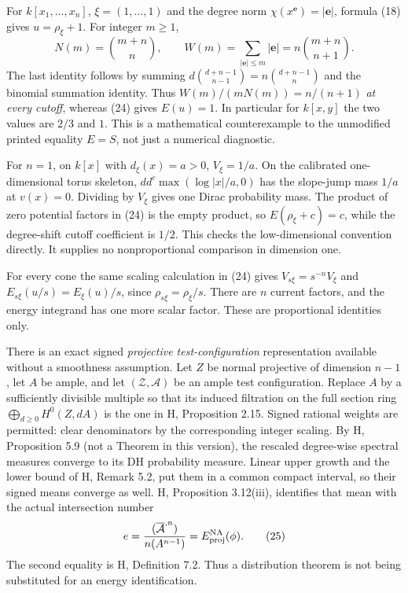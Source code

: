 \documentclass[
  11pt,
]{article}
\begin{document}
For \(k[x_1,\ldots,x_n]\), \(\xi=(1,\ldots,1)\) and the degree norm
\(\chi(x^{\mathbf e})=|\mathbf e|\), formula (18) gives
\(u=\rho_\xi+1\). For integer \(m\geq1\), \[
 N(m)=\binom{m+n}{n},\qquad
 W(m)=\sum_{|\mathbf e|\leq m}|\mathbf e|
      =n\binom{m+n}{n+1}.
\] The last identity follows by summing
\(d\binom{d+n-1}{n-1}=n\binom{d+n-1}{n}\) and the binomial summation
identity. Thus \(W(m)/(mN(m))=n/(n+1)\) \emph{at every cutoff}, whereas
(24) gives \(E(u)=1\). In particular for \(k[x,y]\) the two values are
\(2/3\) and \(1\). This is a mathematical counterexample to the
unmodified printed equality \(E=S\), not just a numerical diagnostic.

For \(n=1\), on \(k[x]\) with \(d_\xi(x)=a>0\), \(V_\xi=1/a\). On the
calibrated one-dimensional torus skeleton, \(dd^c\max(\log|x|/a,0)\) has
the slope-jump mass \(1/a\) at \(v(x)=0\). Dividing by \(V_\xi\) gives
one Dirac probability mass. The product of zero potential factors in
(24) is the empty product, so \(E(\rho_\xi+c)=c\), while the
degree-shift cutoff coefficient is \(1/2\). This checks the
low-dimensional convention directly. It supplies no nonproportional
comparison in dimension one.

For every cone the same scaling calculation in (24) gives
\(V_{s\xi}=s^{-n}V_\xi\) and \(E_{s\xi}(u/s)=E_\xi(u)/s\), since
\(\rho_{s\xi}=\rho_\xi/s\). There are \(n\) current factors, and the
energy integrand has one more scalar factor. These are proportional
identities only.

There is an exact signed \emph{projective test-configuration}
representation available without a smoothness assumption. Let \(Z\) be
normal projective of dimension \(n-1\), let \(A\) be ample, and let
\((\mathcal Z,\mathcal A)\) be an ample test configuration. Replace
\(A\) by a sufficiently divisible multiple so that its induced
filtration on the full section ring \(\bigoplus_{d\geq0}H^0(Z,dA)\) is
the one in H, Proposition 2.15. Signed rational weights are permitted:
clear denominators by the corresponding integer scaling. By H,
Proposition 5.9 (not a Theorem in this version), the rescaled
degree-wise spectral measures converge to its DH probability measure.
Linear upper growth and the lower bound of H, Remark 5.2, put them in a
common compact interval, so their signed means converge as well. H,
Proposition 3.12(iii), identifies that mean with the actual intersection
number \[
 e=\frac{(\overline{\mathcal A}^{,n})}{n(A^{n-1})}
   =E^{\rm NA}_{\rm proj}(\phi).                    \tag{25}
\] The second equality is H, Definition 7.2. Thus a distribution theorem
is not being substituted for an energy identification.
\end{document}
